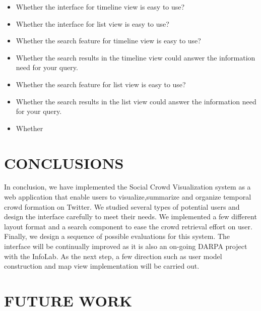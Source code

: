 \documentclass{sig-alternate}
\begin{document}
\begin{itemize}
\item Whether the interface for timeline view is easy to use?
\item Whether the interface for list view is easy to use?
\item Whether the search feature for timeline view is easy to use?
\item Whether the search results in the timeline view could answer the information
need for your query.
\item Whether the search feature for list view is easy to use?
\item Whether the search results in the list view could answer the information
need for your query.
\item Whether 
\end{itemize}



\section{CONCLUSIONS}
In conclusion, we have implemented the Social Crowd Visualization system as a
web application that enable users to visualize,summarize and organize temporal
crowd formation on Twitter. We studied several types of potential users and
design the interface carefully to meet their needs. We implemented a few
different layout format and a search component to ease the crowd retrieval
effort on user. Finally, we design a sequence of possible evaluations for this
system. The interface will be continually improved as it is also an on-going
DARPA project with the InfoLab. As the next step, a few direction such as user
model construction and map view implementation will be carried out.

\section{FUTURE WORK}


 
\end{document}
